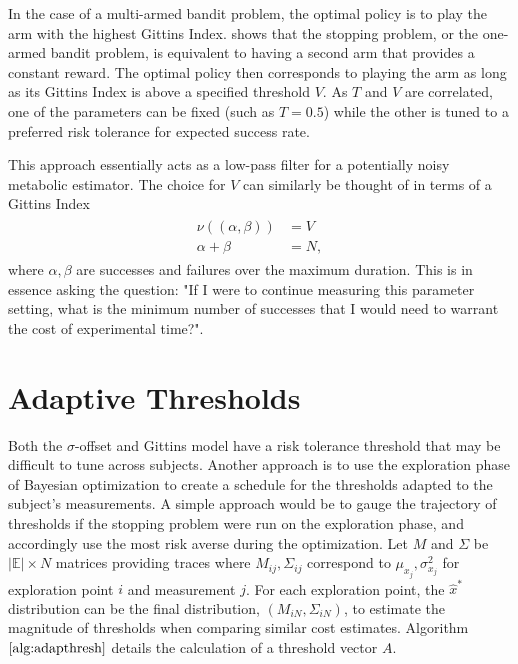 In the case of a multi-armed bandit problem, the optimal policy is to play the arm with the highest Gittins Index. \citet{FergusonStopping2006} shows that the stopping problem, or the one-armed bandit problem, is equivalent to having a second arm that provides a constant reward. The optimal policy then corresponds to playing the arm as long as its Gittins Index is above a specified threshold $V$. As $T$ and $V$ are correlated, one of the parameters can be fixed (such as $T=0.5$) while the other is tuned to a preferred risk tolerance for expected success rate. 

This approach essentially acts as a low-pass filter for a potentially noisy metabolic estimator. The choice for $V$ can similarly be thought of in terms of a Gittins Index 
\begin{align}
\begin{split}
  \nu((\alpha, \beta)) &= V\\
  \alpha + \beta &= N,
\end{split}
\end{align}
where $\alpha, \beta$ are successes and failures over the maximum duration. This is in essence asking the question: "If I were to continue measuring this parameter setting, what is the minimum number of successes that I would need to warrant the cost of experimental time?".

\section{Adaptive Thresholds}
Both the $\sigma$-offset and Gittins model have a risk tolerance threshold that may be difficult to tune across subjects. Another approach is to use the exploration phase of Bayesian optimization to create a schedule for the thresholds adapted to the subject's measurements. A simple approach would be to gauge the trajectory of thresholds if the stopping problem were run on the exploration phase, and accordingly use the most risk averse during the optimization. Let $M$ and $\Sigma$ be $\vert \mathbb{E}\vert \times N$ matrices providing traces where $M_{ij}, \Sigma_{ij}$ correspond to $\mu_{x_j}, \sigma^2_{x_j}$ for exploration point $i$ and measurement $j$. For each exploration point, the $\hat{x}^*$ distribution can be the final distribution, $(M_{iN}, \Sigma_{iN})$, to estimate the magnitude of thresholds when comparing similar cost estimates. Algorithm $\ref{alg:adapthresh}$ details the calculation of a threshold vector $A$.

